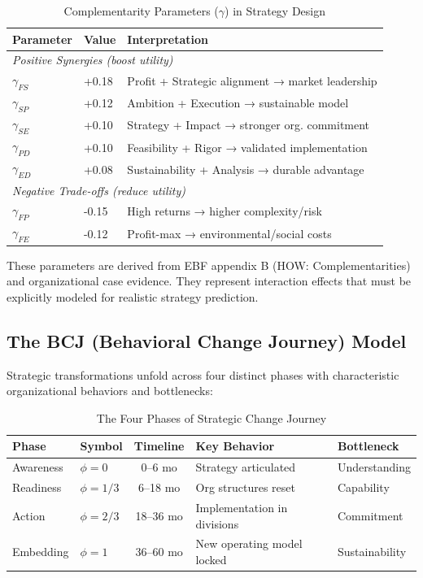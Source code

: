 \begin{table}[htbp]
\centering
\caption{Complementarity Parameters ($\gamma$) in Strategy Design}
\label{tab:sdm-gamma}
\renewcommand{\arraystretch}{1.4}
\begin{tabular}{@{}llp{7cm}@{}}
\toprule
\textbf{Parameter} & \textbf{Value} & \textbf{Interpretation} \\
\midrule
\multicolumn{3}{l}{\textit{Positive Synergies (boost utility)}} \\
$\gamma_{FS}$ & +0.18 & Profit + Strategic alignment → market leadership \\
$\gamma_{SP}$ & +0.12 & Ambition + Execution → sustainable model \\
$\gamma_{SE}$ & +0.10 & Strategy + Impact → stronger org. commitment \\
$\gamma_{PD}$ & +0.10 & Feasibility + Rigor → validated implementation \\
$\gamma_{ED}$ & +0.08 & Sustainability + Analysis → durable advantage \\
\midrule
\multicolumn{3}{l}{\textit{Negative Trade-offs (reduce utility)}} \\
$\gamma_{FP}$ & -0.15 & High returns → higher complexity/risk \\
$\gamma_{FE}$ & -0.12 & Profit-max → environmental/social costs \\
\bottomrule
\end{tabular}
\end{table}

These parameters are derived from EBF appendix B (HOW: Complementarities) and organizational case evidence. They represent interaction effects that must be explicitly modeled for realistic strategy prediction.

\subsection{The BCJ (Behavioral Change Journey) Model}
\label{subsec:sdm-bcj}

Strategic transformations unfold across four distinct phases with characteristic organizational behaviors and bottlenecks:

\begin{table}[htbp]
\centering
\caption{The Four Phases of Strategic Change Journey}
\label{tab:sdm-phases}
\renewcommand{\arraystretch}{1.4}
\begin{tabular}{@{}llcll@{}}
\toprule
\textbf{Phase} & \textbf{Symbol} & \textbf{Timeline} & \textbf{Key Behavior} & \textbf{Bottleneck} \\
\midrule
Awareness & $\phi=0$ & 0--6 mo & Strategy articulated & Understanding \\
Readiness & $\phi=1/3$ & 6--18 mo & Org structures reset & Capability \\
Action & $\phi=2/3$ & 18--36 mo & Implementation in divisions & Commitment \\
Embedding & $\phi=1$ & 36--60 mo & New operating model locked & Sustainability \\
\bottomrule
\end{tabular}
\end{table}

